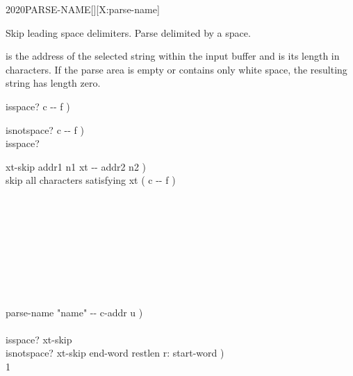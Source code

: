 \begin{worddef}{2020}{PARSE-NAME}[][X:parse-name]
\item {}

	Skip leading space delimiters. Parse  delimited by a
	space.

	 is the address of the selected string within the
	input buffer and  is its length in characters. If the
	parse area is empty or contains only white space, the resulting
	string has length zero.

	\begin{implement} %
		\word{:} isspace?  c -{}- f ) \\
		\tab {}   \word{;}

		\word{:} isnotspace?  c -{}- f ) \\
		\tab isspace?  \word{;}

		\word{:} xt-skip  addr1 n1 xt -{}- addr2 n2 ) \\
		\tab {} skip all characters satisfying xt ( c -{}- f ) \\
		\tab {} \\
		\tab {} \\
		\tab[2]  \\
		\tab {} \\
		\tab[2]     \\
		\tab {} \\
		  \\
		\tab {}  \\
		\tab {}  \word{;}

		\word{:} parse-name  "name" -{}- c-addr u ) \\
		\tab {}    \\
		\tab \word{[']} isspace? xt-skip   \\
		\tab \word{[']} isnotspace? xt-skip  end-word restlen r: start-word ) \\
		\tab {} 1  \word{+}   \word{-}  \word{!} \\
		\tab {}   \word{-} \word{;}
	\end{implement}

	\begin{testing} %
		 \\


\end{testing}
\end{worddef}
